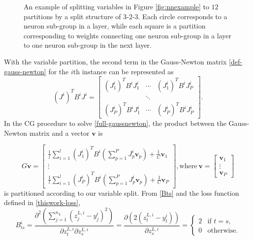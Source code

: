 \documentclass[12pt]{article}
\def\bv{{\boldsymbol v}}
\renewcommand{\baselinestretch}{2}
\begin{document}
\begin{figure}[t]
\begin{center}

\caption{An example of splitting variables in Figure \ref{fig:nnexample} to $12$ partitions by a split structure of $3$-$2$-$3$. 
Each circle corresponds to a neuron sub-group in a layer, while each square is a partition corresponding to weights connecting one neuron sub-group
in a layer to one neuron sub-group in the next layer.}
\label{fig:neuron}
\end{center}
\end{figure}
\par With the variable partition, the second term in the Gauss-Newton matrix \eqref{def-gauss-newton} for the $i$th instance can be represented as
\begin{equation*}
    (J^i)^T B^{i} J^i = 
\begin{bmatrix}
    (J^i_{1})^T B^{i} J^i_{1} & \cdots & (J^i_{1})^T B^{i} J^i_{P} \\
        & \ddots & \\
    (J^i_{P})^T B^{i} J^i_{1} & \cdots & (J^i_{P})^T B^{i} J^i_{P}
\end{bmatrix}.
\end{equation*}
In the CG procedure to solve \eqref{full-gaussnewton}, the product between the Gauss-Newton matrix and a vector $\bv$ is

\begin{equation}
\label{real-jaco}
G\bv = \begin{bmatrix} \frac{1}{l}\sum_{i=1}^l (J^i_{1})^T B^{i} (\sum_{p=1}^P J^i_{p}\bv_p) + \frac{1}{C}\bv_1\\ \vdots 
        \\ \frac{1}{l}\sum_{i=1}^l (J^i_{P})^T B^{i} (\sum_{p=1}^P J^i_{p}\bv_p) + \frac{1}{C}\bv_P \end{bmatrix}
        , \text{where}\ \bv = \begin{bmatrix} \bv_{1} \\ \vdots \\ \bv_{P} \end{bmatrix}
\end{equation}
is partitioned according to our variable split.
From \eqref{Bts} and the loss function defined in \eqref{thiswork-loss},
\begin{equation*}
B^i_{ts} 
= \frac{\partial^2 \left(\sum_{j=1}^{n_L} (z^{L,i}_j - y^i_j)^2 \right)}{\partial z^{L,i}_t \partial z^{L,i}_s} 
= \frac{\partial \left(2(z^{L,i}_t - y^i_t) \right)}{\partial z^{L,i}_s} 
= \begin{cases}
    2 & \text{if } t = s,\\
    0 & \text{otherwise}.
\end{cases}
\end{equation*}
\end{document}
